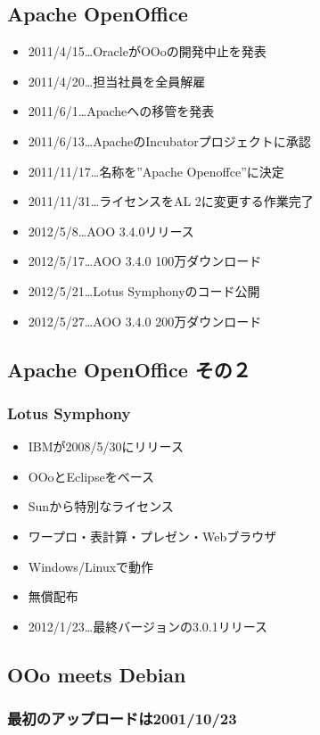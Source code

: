 \documentclass[mingoth,a4paper]{jsarticle}
\begin{document}
\subsection{Apache OpenOffice}

\begin{itemize}
\item 2011/4/15…OracleがOOoの開発中止を発表
\item 2011/4/20…担当社員を全員解雇
\item 2011/6/1…Apacheへの移管を発表
\item 2011/6/13…ApacheのIncubatorプロジェクトに承認
\item 2011/11/17…名称を”Apache Openoffce”に決定
\item 2011/11/31…ライセンスをAL 2に変更する作業完了
\item 2012/5/8…AOO 3.4.0リリース
\item 2012/5/17…AOO 3.4.0 100万ダウンロード
\item 2012/5/21…Lotus Symphonyのコード公開
\item 2012/5/27…AOO 3.4.0 200万ダウンロード
\end{itemize}

\subsection{Apache OpenOffice その２}
\subsubsection{Lotus Symphony}
\begin{itemize}
\item IBMが2008/5/30にリリース
\item OOoとEclipseをベース
\item Sunから特別なライセンス
\item ワープロ・表計算・プレゼン・Webブラウザ
\item Windows/Linuxで動作
\item 無償配布
\item 2012/1/23…最終バージョンの3.0.1リリース
\end{itemize}

\subsection{OOo meets Debian}
\subsubsection{最初のアップロードは2001/10/23}
\end{document}
